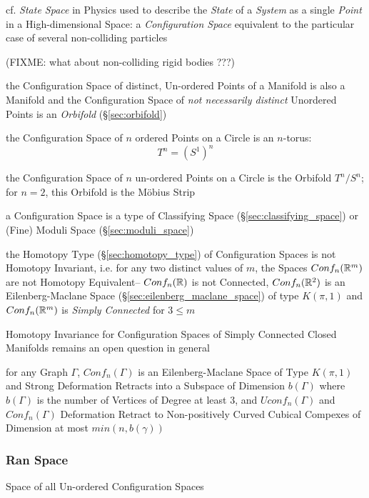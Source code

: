 cf. \emph{State Space} in Physics used to describe the \emph{State} of a
\emph{System} as a single \emph{Point} in a High-dimensional Space: a
\emph{Configuration Space} equivalent to the particular case of several
non-colliding particles

(FIXME: what about non-colliding rigid bodies ???)

the Configuration Space of distinct, Un-ordered Points of a Manifold is also a
Manifold and the Configuration Space of \emph{not necessarily distinct}
Unordered Points is an \emph{Orbifold} (\S\ref{sec:orbifold})

the Configuration Space of $n$ ordered Points on a Circle is an $n$-torus:
\[
  T^n = (S^1)^n
\]

the Configuration Space of $n$ un-ordered Points on a Circle is the Orbifold
$T^n / S^n$; for $n = 2$, this Orbifold is the M\"obius Strip



a Configuration Space is a type of Classifying Space
(\S\ref{sec:classifying_space}) or (Fine) Moduli Space
(\S\ref{sec:moduli_space})

the Homotopy Type (\S\ref{sec:homotopy_type}) of Configuration Spaces is not
Homotopy Invariant, i.e. for any two distinct values of $m$, the Spaces
$Conf_n(\mathbb{R}^m)$ are not Homotopy Equivalent-- $Conf_n(\mathbb{R})$ is not
Connected, $Conf_n(\mathbb{R}^2)$ is an Eilenberg-Maclane Space
(\S\ref{sec:eilenberg_maclane_space}) of type $K(\pi,1)$ and $Conf_n(\mathbb{R}^m)$
is \emph{Simply Connected} for $3 \leq m$

Homotopy Invariance for Configuration Spaces of Simply Connected Closed
Manifolds remains an open question in general

for any Graph $\Gamma$, $Conf_n(\Gamma)$ is an Eilenberg-Maclane Space of Type
$K(\pi,1)$ and Strong Deformation Retracts into a Subspace of Dimension
$b(\Gamma)$ where $b(\Gamma)$ is the number of Vertices of Degree at least 3,
and $Uconf_n(\Gamma)$ and $Conf_n(\Gamma)$ Deformation Retract to
Non-positively Curved Cubical Compexes of Dimension at most $min(n,b(\gamma))$



\subsubsection{Ran Space}\label{sec:ran_space}

Space of all Un-ordered Configuration Spaces



